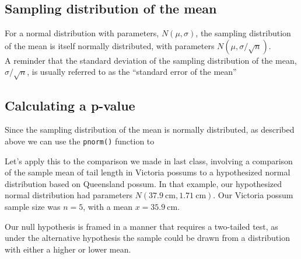 \documentclass[]{book}
\theoremstyle{definition}
\theoremstyle{definition}
\theoremstyle{definition}
\theoremstyle{remark}
\begin{document}
\hypertarget{sampling-distribution-of-the-mean}{%
\subsection{Sampling distribution of the
mean}\label{sampling-distribution-of-the-mean}}

For a normal distribution with parameters, \(N(\mu,\sigma)\), the
sampling distribution of the mean is itself normally distributed, with
parameters \(N(\mu,\sigma/\sqrt{n})\).\\
A reminder that the standard deviation of the sampling distribution of
the mean, \(\sigma/\sqrt{n}\), is usually referred to as the ``standard
error of the mean''

\hypertarget{calculating-a-p-value}{%
\subsection{Calculating a p-value}\label{calculating-a-p-value}}

Since the sampling distribution of the mean is normally distributed, as
described above we can use the \texttt{pnorm()} function to

Let's apply this to the comparison we made in last class, involving a
comparison of the sample mean of tail length in Victoria possums to a
hypothesized normal distribution based on Queensland possum. In that
example, our hypothesized normal distribution had parameters
\(N(37.9\ \text{cm}, 1.71\ \text{cm})\). Our Victoria possum sample size
was \(n=5\), with a mean \(x = 35.9\ \text{cm}\).

Our null hypothesis is framed in a manner that requires a two-tailed
test, as under the alternative hypothesis the sample could be drawn from
a distribution with either a higher or lower mean.
\end{document}
